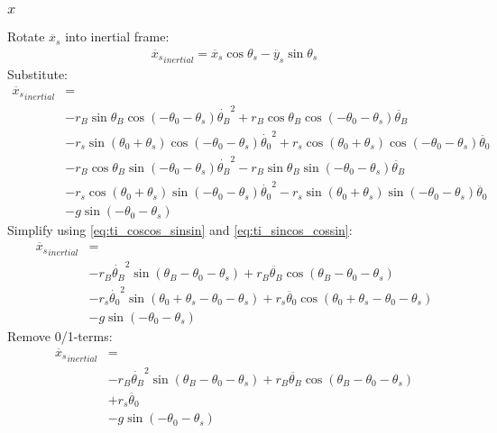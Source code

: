 \documentclass[titlepage]{article}
\numberwithin{equation}{section}
\begin{document}
\subsubsection{$x$}
Rotate $\ddot{x_s}$ into inertial frame:
\begin{align}
\ddot{x_s}_{inertial} = \ddot{x_s} \cos \theta_s - \ddot{y_s} \sin \theta_s 
\end{align}
Substitute:
\begin{align}
\ddot{x_s}_{inertial} &= \nonumber \\
    &- r_B \sin \theta_B \cos{(-\theta_0 - \theta_s)} \dot{\theta_B}^2
     + r_B \cos \theta_B \cos{(-\theta_0 - \theta_s)} \ddot{\theta_B} \nonumber \\
    &- r_s \sin{(\theta_0 + \theta_s)} \cos{(-\theta_0 - \theta_s)} \dot{\theta_0}^2
     + r_s \cos{(\theta_0 + \theta_s)} \cos{(-\theta_0 - \theta_s)} \ddot{\theta_0} \nonumber \\
    &- r_B \cos \theta_B \sin{(-\theta_0 - \theta_s)} \dot{\theta_B}^2
     - r_B \sin \theta_B \sin{(-\theta_0 - \theta_s)} \ddot{\theta_B} \nonumber \\
    &- r_s \cos{(\theta_0 + \theta_s)} \sin{(-\theta_0 - \theta_s)} \dot{\theta_0}^2
     - r_s \sin{(\theta_0 + \theta_s)} \sin{(-\theta_0 - \theta_s)} \ddot{\theta_0} \nonumber \\
    &- g \sin{(-\theta_0 - \theta_s)}
\end{align}
Simplify using \ref{eq:ti_coscos_sinsin} and \ref{eq:ti_sincos_cossin}:
\begin{align}
\ddot{x_s}_{inertial} &= \nonumber \\
    &- r_B \dot{\theta_B}^2 \sin{(\theta_B - \theta_0 - \theta_s)}
     + r_B \ddot{\theta_B} \cos{(\theta_B -\theta_0 - \theta_s)} \nonumber \\
    &- r_s \dot{\theta_0}^2 \sin{(\theta_0 + \theta_s -\theta_0 - \theta_s)}
     + r_s \ddot{\theta_0} \cos{(\theta_0 + \theta_s -\theta_0 - \theta_s)} \nonumber \\
    &- g \sin{(-\theta_0 - \theta_s)}
\end{align}
Remove 0/1-terms:
\begin{align}
\ddot{x_s}_{inertial} &= \nonumber \\
    &- r_B \dot{\theta_B}^2 \sin{(\theta_B - \theta_0 - \theta_s)}
     + r_B \ddot{\theta_B} \cos{(\theta_B -\theta_0 - \theta_s)} \nonumber \\
    &+ r_s \ddot{\theta_0} \nonumber \\
    &- g \sin{(-\theta_0 - \theta_s)}
\end{align}
\end{document}
